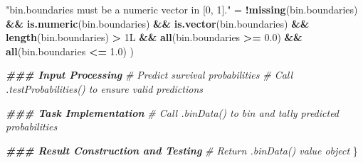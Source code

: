 \documentclass[
]{book}
\newenvironment{Shaded}{\begin{snugshade}}{\end{snugshade}}
\newcommand{\CommentTok}[1]{\textcolor[rgb]{0.56,0.35,0.01}{\textit{#1}}}
\newcommand{\DocumentationTok}[1]{\textcolor[rgb]{0.56,0.35,0.01}{\textbf{\textit{#1}}}}
\newcommand{\FloatTok}[1]{\textcolor[rgb]{0.00,0.00,0.81}{#1}}
\newcommand{\FunctionTok}[1]{\textcolor[rgb]{0.13,0.29,0.53}{\textbf{#1}}}
\newcommand{\NormalTok}[1]{#1}
\newcommand{\OtherTok}[1]{\textcolor[rgb]{0.56,0.35,0.01}{#1}}
\newcommand{\SpecialCharTok}[1]{\textcolor[rgb]{0.81,0.36,0.00}{\textbf{#1}}}
\newcommand{\StringTok}[1]{\textcolor[rgb]{0.31,0.60,0.02}{#1}}
\begin{document}
\begin{Shaded}
\begin{Highlighting}[]
    \StringTok{"\textasciigrave{}bin.boundaries\textasciigrave{} must be a numeric vector in [0, 1]."} \OtherTok{=} 
      \SpecialCharTok{!}\FunctionTok{missing}\NormalTok{(bin.boundaries) }\SpecialCharTok{\&\&} \FunctionTok{is.numeric}\NormalTok{(bin.boundaries) }\SpecialCharTok{\&\&} 
        \FunctionTok{is.vector}\NormalTok{(bin.boundaries) }\SpecialCharTok{\&\&} \FunctionTok{length}\NormalTok{(bin.boundaries) }\SpecialCharTok{\textgreater{}}\NormalTok{ 1L }\SpecialCharTok{\&\&} 
        \FunctionTok{all}\NormalTok{(bin.boundaries }\SpecialCharTok{\textgreater{}=} \FloatTok{0.0}\NormalTok{) }\SpecialCharTok{\&\&} \FunctionTok{all}\NormalTok{(bin.boundaries }\SpecialCharTok{\textless{}=} \FloatTok{1.0}\NormalTok{)}
\NormalTok{  )}
  
  \DocumentationTok{\#\#\# Input Processing}
  \CommentTok{\# Predict survival probabilities}
  \CommentTok{\# Call .testProbabilities() to ensure valid predictions}
  
  \DocumentationTok{\#\#\# Task Implementation}
  \CommentTok{\# Call \textasciigrave{}.binData()\textasciigrave{} to bin and tally predicted probabilities}
  
  \DocumentationTok{\#\#\# Result Construction and Testing}
  \CommentTok{\# Return \textasciigrave{}.binData()\textasciigrave{} value object}
\NormalTok{\}}


\end{Highlighting}
\end{Shaded}
\end{document}
